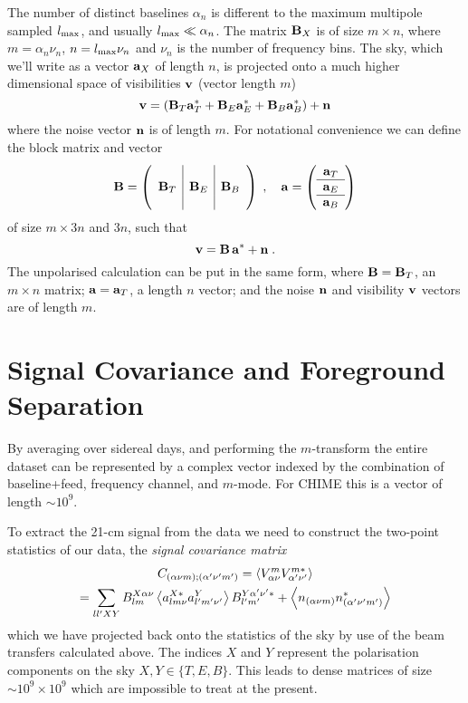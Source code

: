 \documentclass[prd,twocolumn,nofootinbib]{revtex4}
\begin{document}
The number of distinct baselines $\alpha_n$ is different to the
maximum multipole sampled $l_{\text{max}}$, and usually $l_{\text{max}} \ll \alpha_n$. The matrix
$\mathbf{B}_X$ is of size $m \times n$, where $m = \alpha_n \nu_n$, $n = l_{\text{max}} \nu_n$
and $\nu_n$ is the number of frequency bins. The sky, which we'll write as a
vector $\mathbf{a}_X$ of length $n$, is projected onto a much higher dimensional space
of visibilities $\mathbf{v}$ (vector length $m$)
\begin{equation}
\mathbf{v} = \left(\mathbf{B}_T \mathbf{a}_T^* + \mathbf{B}_E \mathbf{a}_E^* + \mathbf{B}_B \mathbf{a}_B^* \right) + \mathbf{n}
\end{equation}
where the noise vector $\mathbf{n}$ is of length $m$. For notational convenience we can
define the block matrix and vector
\begin{equation}
\mathbf{B} = \left(\begin{array}{c|c|c} & & \\ \mathbf{B}_T & \mathbf{B}_E & \mathbf{B}_B \\ &
    &\end{array}\right)
\;, \quad
\mathbf{a} = \left(\begin{array}{c} \mathbf{a}_T \\ \hline \mathbf{a}_E \\ \hline
    \mathbf{a}_B\end{array}\right)
\end{equation}
of size $m \times 3 n$ and $3 n$, such that
\begin{equation}
\label{eq:matnot}
\mathbf{v} = \mathbf{B}\, \mathbf{a}^* + \mathbf{n} \; .
\end{equation}
The unpolarised calculation can be put in the same form, where $\mathbf{B} = \mathbf{B}_T$, an
$m \times n$ matrix; $\mathbf{a} = \mathbf{a}_T$, a length $n$ vector; and the noise $\mathbf{n}$ and
visibility $\mathbf{v}$ vectors are of length $m$.



\section{Signal Covariance and Foreground Separation}

By averaging over sidereal days, and performing the $m$-transform the entire
dataset can be represented by a complex vector indexed by the combination of
baseline+feed, frequency channel, and $m$-mode. For CHIME this is a vector of
length $\sim 10^9$.

To extract the 21-cm signal from the data we need to construct the two-point
statistics of our data, the \emph{signal covariance matrix}
\begin{multline}
\label{eq:signal_cv_full}
C_{(\alpha \nu m); (\alpha' \nu' m')} = \left\langle V^m_{\alpha \nu} V^{m *}_{\alpha'
  \nu'} \right\rangle \\
 = \sum_{l l' X Y} B^{X \alpha \nu}_{l m} \left\langle a_{l m \nu}^{X *} a_{l' m' \nu'}^{Y} \right\rangle
B^{Y \alpha' \nu' *}_{l' m'} + \left\langle n_{(\alpha \nu m)} n^*_{(\alpha' \nu' m')} \right\rangle
\end{multline}
which we have projected back onto the statistics of the sky by use of the beam
transfers calculated above. The indices $X$ and $Y$ represent the polarisation
components on the sky $X, Y \in \{T, E, B\}$. This leads to dense matrices of
size $\sim 10^9 \times 10^9$ which are impossible to treat at the present.
\end{document}
